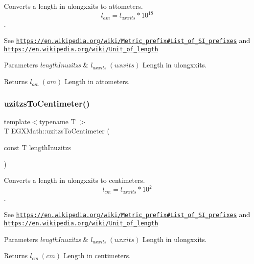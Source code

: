 Converts a length in ulongxxits to attometers. \[ l_{am}=l_{uxxits} * 10^{18} \]. 

See \href{https://en.wikipedia.org/wiki/Metric_prefix#List_of_SI_prefixes}{\tt https\+://en.\+wikipedia.\+org/wiki/\+Metric\+\_\+prefix\#\+List\+\_\+of\+\_\+\+S\+I\+\_\+prefixes} and \href{https://en.wikipedia.org/wiki/Unit_of_length}{\tt https\+://en.\+wikipedia.\+org/wiki/\+Unit\+\_\+of\+\_\+length} 
\begin{DoxyParams}{Parameters}
{\em length\+Inuzitzs} & $ l_{uxxits}\ (uxxits)$ Length in ulongxxits. \\
\hline
\end{DoxyParams}
\begin{DoxyReturn}{Returns}
$ l_{am}\ (am)$ Length in attometers. 
\end{DoxyReturn}
\mbox{\label{group___e_g_x_math-_conversions-_length_conversions-uzitzs-_s_i_ga1fb15b72a000d43348190004a49ed7bc}} 
\subsubsection{\texorpdfstring{uzitzs\+To\+Centimeter()}{uzitzsToCentimeter()}}
{\footnotesize\ttfamily template$<$typename T $>$ \\
T E\+G\+X\+Math\+::uzitzs\+To\+Centimeter (\begin{DoxyParamCaption}\item[{const T}]{length\+Inuzitzs }\end{DoxyParamCaption})}



Converts a length in ulongxxits to centimeters. \[ l_{cm}=l_{uxxits} * 10^{2} \]. 

See \href{https://en.wikipedia.org/wiki/Metric_prefix#List_of_SI_prefixes}{\tt https\+://en.\+wikipedia.\+org/wiki/\+Metric\+\_\+prefix\#\+List\+\_\+of\+\_\+\+S\+I\+\_\+prefixes} and \href{https://en.wikipedia.org/wiki/Unit_of_length}{\tt https\+://en.\+wikipedia.\+org/wiki/\+Unit\+\_\+of\+\_\+length} 
\begin{DoxyParams}{Parameters}
{\em length\+Inuzitzs} & $ l_{uxxits}\ (uxxits)$ Length in ulongxxits. \\
\hline
\end{DoxyParams}
\begin{DoxyReturn}{Returns}
$ l_{cm}\ (cm)$ Length in centimeters. 
\end{DoxyReturn}
\mbox{\label{group___e_g_x_math-_conversions-_length_conversions-uzitzs-_s_i_ga62dcf7a675d92ce74d56e67f2fed7ace}} 
